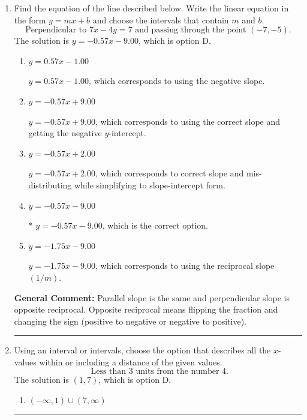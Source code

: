 \documentclass{extbook}[14pt]
\newcommand{\litem}[1]{\item #1

\rule{\textwidth}{0.4pt}}
\begin{document}
\begin{enumerate}
{\begin{enumerate}[label=\Alph*.]
 $y = -2.33x + 16$, which corresponds to using the correct slope/equation but not distributing correctly using the second point.
\item \( y = -2.33x -4 \)

 $y = -2.33x -4$, which corresponds to using the correct slope/equation but not distributing correctly using the first point.
\item \( y = 2.33x + 29.33 \)

 $y = 2.33x + 29.33$, which corresponds to using the negative slope and the correct equation.
\item \( y = -2.33x -17.33 \)

* $y = -2.33x -17.33$, which is the correct option.
\end{enumerate}

\textbf{General Comment:} Remember to keep your points in order when plugging in to the slope formula.
}
\litem{
Find the equation of the line described below. Write the linear equation in the form $ y=mx+b $ and choose the intervals that contain $m$ and $b$.
\[ \text{Perpendicular to } 7 x - 4 y = 7 \text{ and passing through the point } (-7, -5). \]The solution is \( y = -0.57x - 9.00 \), which is option D.\begin{enumerate}[label=\Alph*.]
\item \( y = 0.57x - 1.00 \)

 $y = 0.57x - 1.00$, which corresponds to using the negative slope.
\item \( y = -0.57x + 9.00 \)

 $y = -0.57x + 9.00$, which corresponds to using the correct slope and getting the negative $y$-intercept.
\item \( y = -0.57x + 2.00 \)

 $y = -0.57x + 2.00$, which corresponds to correct slope and mis-distributing while simplifying to slope-intercept form.
\item \( y = -0.57x - 9.00 \)

* $y = -0.57x - 9.00$, which is the correct option.
\item \( y = -1.75x - 9.00 \)

 $y = -1.75x - 9.00$, which corresponds to using the reciprocal slope $(1/m)$.
\end{enumerate}

\textbf{General Comment:} Parallel slope is the same and perpendicular slope is opposite reciprocal. Opposite reciprocal means flipping the fraction and changing the sign (positive to negative or negative to positive).
}
\litem{
Using an interval or intervals, choose the option that describes all the $x$-values within or including a distance of the given values.
\[ \text{ Less than } 3 \text{ units from the number } 4. \]The solution is \( (1, 7) \), which is option D.\begin{enumerate}[label=\Alph*.]
\item \( (-\infty, 1) \cup (7, \infty) \)


\end{enumerate}}
\end{enumerate}
\end{document}
